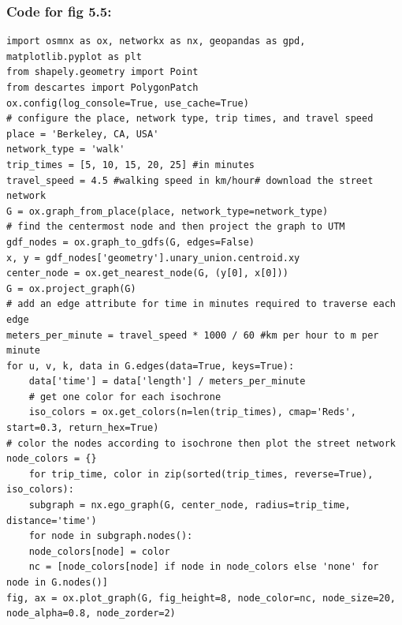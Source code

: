 \subsubsection{Code for fig 5.5:}
\begin{verbatim}
import osmnx as ox, networkx as nx, geopandas as gpd, matplotlib.pyplot as plt
from shapely.geometry import Point
from descartes import PolygonPatch
ox.config(log_console=True, use_cache=True)
# configure the place, network type, trip times, and travel speed
place = 'Berkeley, CA, USA'
network_type = 'walk'
trip_times = [5, 10, 15, 20, 25] #in minutes
travel_speed = 4.5 #walking speed in km/hour# download the street network
G = ox.graph_from_place(place, network_type=network_type)
# find the centermost node and then project the graph to UTM
gdf_nodes = ox.graph_to_gdfs(G, edges=False)
x, y = gdf_nodes['geometry'].unary_union.centroid.xy
center_node = ox.get_nearest_node(G, (y[0], x[0]))
G = ox.project_graph(G)
# add an edge attribute for time in minutes required to traverse each edge
meters_per_minute = travel_speed * 1000 / 60 #km per hour to m per minute
for u, v, k, data in G.edges(data=True, keys=True):
	data['time'] = data['length'] / meters_per_minute
	# get one color for each isochrone
	iso_colors = ox.get_colors(n=len(trip_times), cmap='Reds', start=0.3, return_hex=True)
# color the nodes according to isochrone then plot the street network
node_colors = {}
	for trip_time, color in zip(sorted(trip_times, reverse=True), iso_colors):
	subgraph = nx.ego_graph(G, center_node, radius=trip_time, distance='time')
	for node in subgraph.nodes():
	node_colors[node] = color
	nc = [node_colors[node] if node in node_colors else 'none' for node in G.nodes()]
fig, ax = ox.plot_graph(G, fig_height=8, node_color=nc, node_size=20, node_alpha=0.8, node_zorder=2)

\end{verbatim}
